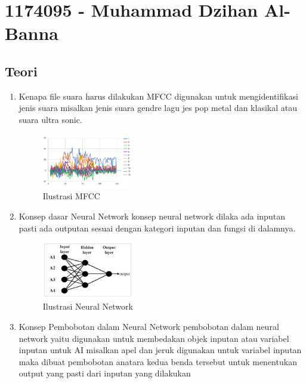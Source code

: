\section{1174095 - Muhammad Dzihan Al-Banna}
    \subsection{Teori}
    \begin{enumerate}
        \item Kenapa file suara harus dilakukan MFCC
        \subitem digunakan untuk mengidentifikasi jenis suara misalkan jenis suara gendre lagu jes pop metal dan klasikal atau suara ultra sonic. 
        
        \begin{figure}[H]
            \includegraphics[width=4cm]{figures/1174095/tugas6/teori1.png}
            \centering
              \caption{Ilustrasi MFCC}
        \end{figure}
        
        \item Konsep dasar Neural Network
        \subitem konsep neural network dilaka ada inputan pasti ada outputan sesuai dengan kategori inputan dan fungsi di dalamnya.
        
        \begin{figure}[H]
            \includegraphics[width=4cm]{figures/1174095/tugas6/teori2.png}
            \centering
              \caption{Ilustrasi Neural Network}
        \end{figure}
        
        \item Konsep Pembobotan dalam Neural Network
        \subitem pembobotan dalam neural network yaitu digunakan untuk membedakan objek inputan atau variabel inputan untuk AI misalkan apel dan jeruk digunakan untuk variabel inputan maka dibuat pembobotan anatara kedua benda tersebut untuk menentukan output yang pasti dari inputan yang dilakukan
        

\end{enumerate}

